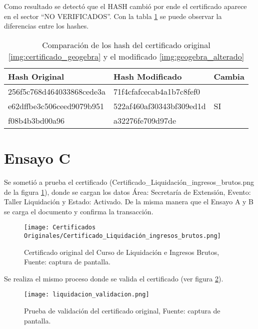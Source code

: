 Como resultado se detectó que el HASH cambió por ende el certificado aparece en el sector “NO VERIFICADOS”.
Con la tabla \ref{table:tabla-ensayo-b} se puede observar la diferencias entre los hashes.

\begin{table}[H]
  \centering
  \begin{tabular}{ |l|l|l| }
  \hline
  Hash Original              & Hash Modificado          & Cambia \\
  \hline
  256f5c768d464033868cede3a & 71f4cfafcecab4a1b7c8fef0  &    \\
  e62dffbe3c506ceed9079b951 & 522af460af30343bf309ed1d  & SI \\
  f08b4b3bd00a96            & a32276fe709d97de          &    \\
  \hline
  \end{tabular}
  \caption{Comparación de los hash del certificado original \ref{img:certificado_geogebra} y el modificado \ref{img:geogebra_alterado}  }
  \label{table:tabla-ensayo-b}
  \end{table}

  \section{Ensayo C}
  Se sometió a prueba el certificado  (Certificado\_Liquidación\_ingresos\_brutos.png de la figura \ref{img:certificado_liquidacion}),
donde se cargan los datos Área: Secretaría de Extensión, Evento: Taller Liquidación y Estado: Activado.
De la misma manera que el Ensayo A y B se carga el documento y confirma la transacción.

  \begin{figure}[H]
    \centering
    {\texttt{[image: Certificados Originales/Certificado\_Liquidación\_ingresos\_brutos.png]}}
    \caption{Certificado original del Curso de  Liquidación e Ingresos  Brutos,  Fuente: captura de pantalla. }
    \label{img:certificado_liquidacion}
  \end{figure}

Se realiza el mismo proceso donde se valida el certificado (ver figura \ref{img:liquidacion_validacion}).

\begin{figure}[H]
  \centering
  {\texttt{[image: liquidacion\_validacion.png]}}
  \caption{Prueba de validación del certificado original,  Fuente: captura de pantalla. }
  \label{img:liquidacion_validacion}
\end{figure}

